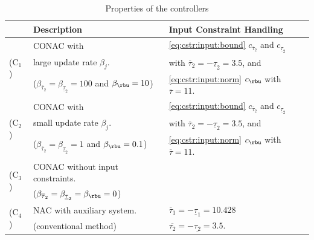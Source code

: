 \documentclass[letterpaper, journal]{IEEEtran}
\begin{document}
\begin{table}[t]
    \renewcommand{\arraystretch}{1.3}
    \caption{Properties of the controllers}
    \label{table:controller}
    \centering
    \begin{tabular}{m{.25cm} m{4cm} l}
    \hline
        &\bf{Description}&\bf{Input Constraint Handling}\\
    \hline
    \hline
        & CONAC with & \eqref{eq:cstr:input:bound} $c_{\overline\tau_2}$ and $c_{\underline\tau_2}$ \\
        & large update rate $\beta_j$. & with $\overline{\tau}_2=-\underline{\tau}_2=3.5$, and \\
        & ($\beta_{\overline{\tau}_2}=\beta_{\underline{\tau}_2}=100$ and $\beta_{\rbu}=10$) & \eqref{eq:cstr:input:norm} $c_{\rbu}$ with $\overline{\tau}=11$. \\
    \hline
        & CONAC with & \eqref{eq:cstr:input:bound} $c_{\overline\tau_2}$ and $c_{\underline\tau_2}$ \\
        & small update rate $\beta_j$. & with $\overline{\tau}_2=-\underline{\tau}_2=3.5$, and \\
        & ($\beta_{\overline{\tau}_2}=\beta_{\underline{\tau}_2}=1$ and $\beta_{\rbu}=0.1$) & \eqref{eq:cstr:input:norm} $c_{\rbu}$ with $\overline{\tau}=11$. \\
    \hline
        & CONAC without input constraints.&  \\
        & ($\beta_{\overline{\tau}_2}=\beta_{\underline{\tau}_2}=\beta_{\rbu}=0$) & \\
    \hline
        & NAC with auxiliary system. & $\overline{\tau}_1=-\underline{\tau}_1=10.428$ \\
        & (conventional method) & $\overline{\tau_2}=-\underline{\tau_2}=3.5$. \\    
    \hline
    \end{tabular}
    \label{table:controllers}
\end{table}


\hfill
\end{document}
